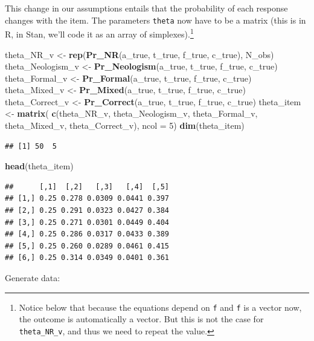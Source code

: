 \documentclass[12pt,]{krantz}
\newenvironment{Shaded}{\begin{snugshade}}{\end{snugshade}}
\newcommand{\DataTypeTok}[1]{\textcolor[rgb]{0.13,0.29,0.53}{#1}}
\newcommand{\DecValTok}[1]{\textcolor[rgb]{0.00,0.00,0.81}{#1}}
\newcommand{\KeywordTok}[1]{\textcolor[rgb]{0.13,0.29,0.53}{\textbf{#1}}}
\newcommand{\NormalTok}[1]{#1}
\newcommand{\StringTok}[1]{\textcolor[rgb]{0.31,0.60,0.02}{#1}}
\theoremstyle{definition}
\theoremstyle{definition}
\theoremstyle{definition}
\theoremstyle{remark}
\begin{document}
This change in our assumptions entails that the probability of each response changes with the item. The parameters \texttt{theta} now have to be a matrix (this is in R, in Stan, we'll code it as an array of simplexes).\footnote{Notice below that because the equations depend on \texttt{f} and \texttt{f} is a vector now, the outcome is automatically a vector. But this is not the case for \texttt{theta\_NR\_v}, and thus we need to repeat the value.}

\begin{Shaded}
\begin{Highlighting}[]
\NormalTok{theta_NR_v <-}\StringTok{ }\KeywordTok{rep}\NormalTok{(}\KeywordTok{Pr_NR}\NormalTok{(a_true, t_true, f_true, c_true), N_obs)}
\NormalTok{theta_Neologism_v <-}\StringTok{ }\KeywordTok{Pr_Neologism}\NormalTok{(a_true, t_true, f_true, c_true)}
\NormalTok{theta_Formal_v <-}\StringTok{ }\KeywordTok{Pr_Formal}\NormalTok{(a_true, t_true, f_true, c_true)}
\NormalTok{theta_Mixed_v <-}\StringTok{ }\KeywordTok{Pr_Mixed}\NormalTok{(a_true, t_true, f_true, c_true)}
\NormalTok{theta_Correct_v <-}\StringTok{ }\KeywordTok{Pr_Correct}\NormalTok{(a_true, t_true, f_true, c_true)}
\NormalTok{theta_item <-}\StringTok{ }\KeywordTok{matrix}\NormalTok{(}
  \KeywordTok{c}\NormalTok{(theta_NR_v,}
\NormalTok{    theta_Neologism_v,}
\NormalTok{    theta_Formal_v,}
\NormalTok{    theta_Mixed_v,}
\NormalTok{    theta_Correct_v),}
  \DataTypeTok{ncol =} \DecValTok{5}\NormalTok{)}
\KeywordTok{dim}\NormalTok{(theta_item)}
\end{Highlighting}
\end{Shaded}

\begin{verbatim}
## [1] 50  5
\end{verbatim}

\begin{Shaded}
\begin{Highlighting}[]
\KeywordTok{head}\NormalTok{(theta_item)}
\end{Highlighting}
\end{Shaded}

\begin{verbatim}
##      [,1]  [,2]   [,3]   [,4]  [,5]
## [1,] 0.25 0.278 0.0309 0.0441 0.397
## [2,] 0.25 0.291 0.0323 0.0427 0.384
## [3,] 0.25 0.271 0.0301 0.0449 0.404
## [4,] 0.25 0.286 0.0317 0.0433 0.389
## [5,] 0.25 0.260 0.0289 0.0461 0.415
## [6,] 0.25 0.314 0.0349 0.0401 0.361
\end{verbatim}

Generate data:
\end{document}
